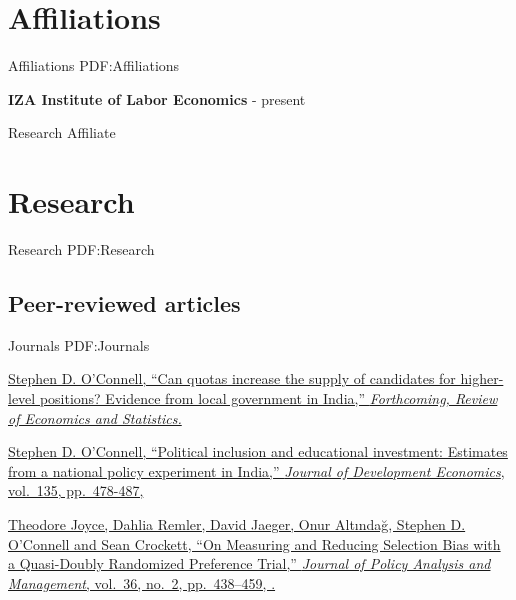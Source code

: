 \documentclass[letterpaper,10pt,oneside]{article}
\begin{document}
\begin{body}
\section
{Affiliations}
{Affiliations}
{PDF:Affiliations}



\textbf{IZA Institute of Labor Economics}
\hfill
{} - present

Research Affiliate

%


\section
{Research}
{Research}
{PDF:Research}


\subsection
{Peer-reviewed articles}
{Journals}
{PDF:Journals}

\EntryGapNoBreak
\href{https://www.mitpressjournals.org/doi/pdf/10.1162/rest_a_00802}
{Stephen D. O'Connell, ``Can quotas increase the supply of candidates for higher-level positions? Evidence from local government in India,'' \textit{Forthcoming, Review of Economics and Statistics.}}

\EntryGapNoBreak
\href{https://doi.org/10.1016/j.jdeveco.2018.08.004}
{Stephen D. O'Connell, ``Political inclusion and educational investment: Estimates from a national policy experiment in India,''
\textit{Journal of Development Economics}, vol.~135, pp.~478-487,  }




\EntryGapNoBreak
\href{http://www.stephenoconnell.org/assets/papers/DPRTjpam_final.pdf}
{Theodore Joyce, Dahlia Remler, David Jaeger, Onur Altındağ, Stephen D. O'Connell and Sean Crockett,
``On Measuring and Reducing Selection Bias with a Quasi-Doubly Randomized Preference Trial,''
\textit{Journal of Policy Analysis and Management},
vol.~36,
no.~2,
pp.~438--459,
.}


\end{body}
\end{document}
